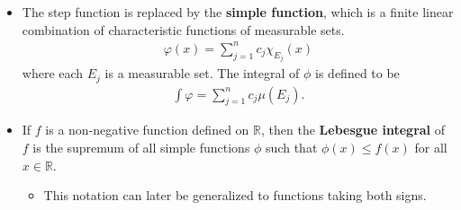 \documentclass[10pt]{article}
\newcommand{\Real}{\mathbb{R}}
\begin{document}
\begin{itemize}
\begin{itemize}
    \item The step function is replaced by the {\bf simple function}, which is a finite linear combination of characteristic functions of measurable sets.
    \begin{align*}
        \varphi(x) = \sum_{j=1}^n c_j \chi_{E_j}(x)
    \end{align*}
    where each $E_j$ is a measurable set. The integral of $\phi$ is defined to be
    \begin{align*}
        \int \varphi = \sum_{j=1}^n c_j \mu(E_j).
    \end{align*}

    \item If $f$ is a non-negative function defined on $\Real$, then the {\bf Lebesgue integral} of $f$ is the supremum of all simple functions $\phi$ such that $\phi(x) \leq f(x)$ for all $x \in \Real$.
    \begin{itemize}
      \item This notation can later be generalized to functions taking both signs.
    \end{itemize}    
  \end{itemize}


\end{itemize}
\end{document}
